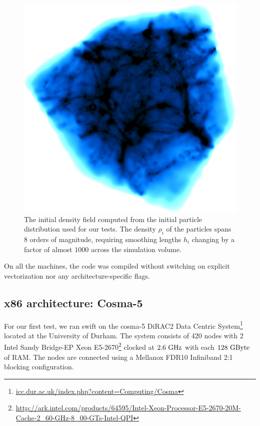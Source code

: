 \documentclass{sig-alternate-05-2015}
\newcommand{\swift}{{\sc swift}\xspace}
\begin{document}
\begin{figure}
\centering
\includegraphics[width=\columnwidth]{Figures/cosmoVolume}
\caption{The initial density field computed from the initial particle
  distribution used for our tests. The density $\rho_i$ of the particles spans 8
  orders of magnitude, requiring smoothing lengths $h_i$ changing by a factor of
  almost $1000$ across the simulation volume. \label{fig:ICs}}
\end{figure}  

On all the machines, the code was compiled without switching on explicit
vectorization nor any architecture-specific flags. 

\subsection{x86 architecture: Cosma-5}

For our first test, we ran \swift on the cosma-5 DiRAC2 Data Centric
System\footnote{\url{icc.dur.ac.uk/index.php?content=Computing/Cosma}} located
at the University of Durham. The system consists of 420 nodes with 2 Intel Sandy
Bridge-EP Xeon
E5-2670\footnote{\url{http://ark.intel.com/products/64595/Intel-Xeon-Processor-E5-2670-20M-Cache-2_60-GHz-8_00-GTs-Intel-QPI}}
clocked at $2.6~\rm{GHz}$ with each $128~\rm{GByte}$ of RAM. The nodes are
connected using a Mellanox FDR10 Infiniband 2:1 blocking configuration.
\end{document}
